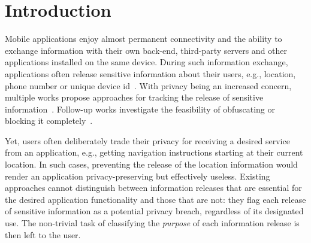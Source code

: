 \section{Introduction}
\label{sec:intro} 
Mobile applications enjoy almost permanent connectivity and the ability to exchange information with their own back-end, third-party servers and other applications installed on the same device. 
During such information exchange, applications often release sensitive information about their users, e.g., location, phone number or unique device id~\cite{Enck:Gilbert:Chun:Cox:Jung:McDaniel:Sheth:OSDI10, Egele:Kruegel:Kirda:Vign:NDSS11,Tripp:Rubin:SEC14}. 
With privacy being an increased concern, multiple works propose approaches for tracking the release of 
sensitive information~\cite{Enck:Gilbert:Chun:Cox:Jung:McDaniel:Sheth:OSDI10,Egele:Kruegel:Kirda:Vign:NDSS11,Arzt:Rasthofer:Fritz:Bodden:Bartel:Klein:Traon:Octeau:McDaniel:PLDI14, Tripp:Rubin:SEC14,Gordon:Kim:Perkins:Gilham:Nguyen:Rinard:NDSS15}. Follow-up works investigate the
feasibility of obfuscating or blocking it completely~\cite{Hornyack:Han:Jung:Schechter:Wetherall:CCS11}.

Yet, users often deliberately trade their privacy for receiving a desired service from an application, 
e.g., getting navigation instructions starting at their current location. 
In such cases, preventing the release of the location information would render an application privacy-preserving but effectively useless.
Existing approaches cannot distinguish between information releases that are essential for the desired application functionality and those that are not: 
they flag each release of sensitive information as a potential privacy breach, regardless of its designated use.
The non-trivial task of classifying the \emph{purpose} of each information release is then left to the user. 



